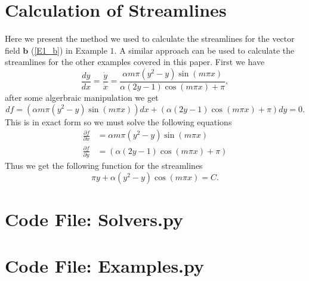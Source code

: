 \documentclass[12pt]{ociamthesis}
\begin{document}
\chapter{Calculation of Streamlines} \label{E1_Stream_Calc}
Here we present the method we used to calculate the streamlines for the vector field $\mathbf{b}$ (\ref{E1_b}) in Example $1$. A similar approach can be used to calculate the streamlines for the other examples covered in this paper. First we have
\begin{equation}
\frac{dy}{dx} = \frac{\dot{y}}{\dot{x}} = 
\frac{\alpha m \pi (y^2-y)\sin(m \pi x)}{\alpha(2y-1)\cos(m\pi x) + \pi},
\end{equation}
after some algerbraic manipulation we get
\begin{equation}
df = (\alpha m\pi (y^2-y)\sin(m\pi x))dx + 
(\alpha(2y-1)\cos(m\pi x)+\pi)dy = 0.
\end{equation}
This is in exact form so we must solve the following equations
\begin{align}
\frac{\partial f}{\partial x} &= \alpha m\pi (y^2-y)\sin(m\pi x)\\
\frac{\partial f}{\partial y} &= (\alpha(2y-1)\cos(m\pi x)+\pi)
\end{align}
Thus we get the following function for the streamlines
\begin{equation}
\pi y + \alpha (y^2-y)\cos(m\pi x) = C.
\end{equation}

\chapter{Code File: Solvers.py} \label{CFSolve}

\chapter{Code File: Examples.py} \label{CFExample}
\end{document}
